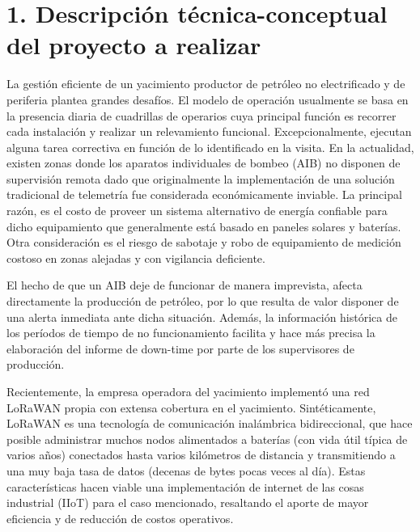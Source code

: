 \documentclass[
11pt, %
]{charter}
\begin{document}
\section{1. Descripción técnica-conceptual del proyecto a realizar}
\label{sec:descripcion}



La gestión eficiente de un yacimiento productor de petróleo no electrificado y de periferia plantea grandes desafíos. El modelo de operación usualmente se basa en la presencia diaria de cuadrillas de operarios cuya principal función es recorrer cada instalación y realizar un relevamiento funcional. Excepcionalmente, ejecutan alguna tarea correctiva en función de lo identificado en la visita.
En la actualidad, existen zonas donde los aparatos individuales de bombeo (AIB) no disponen de supervisión remota dado que originalmente la implementación de una solución tradicional de telemetría fue considerada económicamente inviable. La principal razón, es el costo de proveer un sistema alternativo de energía confiable para dicho equipamiento que generalmente está basado en paneles solares y baterías. Otra consideración es el riesgo de sabotaje y robo de equipamiento de medición costoso en zonas alejadas y con vigilancia deficiente. 

El hecho de que un AIB deje de funcionar de manera imprevista, afecta directamente la producción de petróleo, por lo que resulta de valor disponer de una alerta inmediata ante dicha situación. Además, la información histórica de los períodos de tiempo de no funcionamiento facilita y hace más precisa la elaboración del informe de down-time por parte de los supervisores de producción.
 
Recientemente, la empresa operadora del yacimiento implementó una red LoRaWAN propia con extensa cobertura en el yacimiento. Sintéticamente, LoRaWAN es una tecnología de comunicación inalámbrica bidireccional, que hace posible administrar muchos nodos alimentados a baterías (con vida útil típica de varios años) conectados hasta varios kilómetros de distancia y transmitiendo a una muy baja tasa de datos (decenas de bytes pocas veces al día). Estas características hacen viable una implementación de internet de las cosas industrial (IIoT) para el caso mencionado, resaltando el aporte de mayor eficiencia y de reducción de costos operativos.
\end{document}
